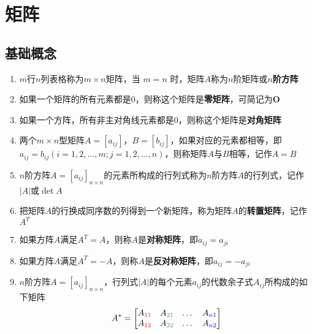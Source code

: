 \documentclass[a4paper,12pt]{article}
\begin{document}


    \section{矩阵}

    \subsection{基础概念}

    \begin{enumerate}
        \item $m$行$n$列表格称为$m \times n$矩阵，当 $m = n$ 时，矩阵$A$称为$n$阶矩阵或\textbf{$n$阶方阵}
        \item 如果一个矩阵的所有元素都是$0$，则称这个矩阵是\textbf{零矩阵}，可简记为$\mathbf{O}$
        \item 如果一个方阵，所有非主对角线元素都是0，则称这个矩阵是\textbf{对角矩阵}
        \item 两个$m \times n$型矩阵$A = [a_{ij}]$，$B = [b_{ij}]$，如果对应的元素都相等，即$a_{ij} = b_{ij}(i = 1,2,\dots,m; j = 1,2,\dots,n)$，则称矩阵$A$与$B$相等，记作$A = B$
        \item $n$阶方阵$A = [a_{ij}]_{n \times n}$的元素所构成的行列式称为$n$阶方阵$A$的行列式，记作$|A|$或$\det A$
        \item 把矩阵$A$的行换成同序数的列得到一个新矩阵，称为矩阵$A$的\textbf{转置矩阵}，记作$A^T$
        \item 如果方阵$A$满足$A^T = A$，则称$A$是\textbf{对称矩阵}，即$a_{ij} = a_{ji}$
        \item 如果方阵$A$满足$A^T = -A$，则称$A$是\textbf{反对称矩阵}，即$a_{ij} = -a_{ji}$
        \item $n$阶方阵$A = [a_{ij}]_{n \times n}$，行列式$|A|$的每个元素$a_{ij}$的代数余子式$A_{ij}$所构成的如下矩阵
        \[
            A^* =
            \begin{bmatrix}
                A_{\color{red}{11}} & A_{\textcolor[rgb]{0.2, 0.6, 0.3}{21}} & \dots & A_{\textcolor{blue}{n1}} \\
                A_{\color{red}{12}} & A_{\textcolor[rgb]{0.2, 0.6, 0.3}{22}} & \dots & A_{\textcolor{blue}{n2}} \\

\end{bmatrix}\]
\end{enumerate}
\end{document}
